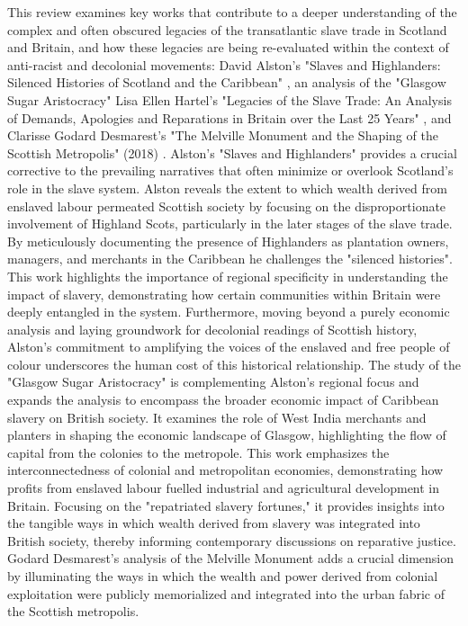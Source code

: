 \documentclass{scrartcl}
\begin{document}
This review examines key works that contribute to a deeper understanding of the complex and often obscured legacies of the transatlantic slave trade in Scotland and Britain, and how these legacies are being re-evaluated within the context of anti-racist and decolonial movements: David Alston's "Slaves and Highlanders: Silenced Histories of Scotland and the Caribbean" \cite{alston_2021}, an analysis of the "Glasgow Sugar Aristocracy" \cite{mullen_2022} Lisa Ellen Hartel's "Legacies of the Slave Trade: An Analysis of Demands, Apologies and Reparations in Britain over the Last 25 Years" \cite{hartel_2024} , and Clarisse Godard Desmarest's "The Melville Monument and the Shaping of the Scottish Metropolis" (2018) \cite{godard_2018}.
Alston's "Slaves and Highlanders" provides a crucial corrective to the prevailing narratives that often minimize or overlook Scotland's role in the slave system. 
Alston reveals the extent to which wealth derived from enslaved labour permeated Scottish society by focusing on the disproportionate involvement of Highland Scots, particularly in the later stages of the slave trade.
By meticulously documenting the presence of Highlanders as plantation owners, managers, and merchants in the Caribbean he challenges the "silenced histories".
This work highlights the importance of regional specificity in understanding the impact of slavery, demonstrating how certain communities within Britain were deeply entangled in the system.
 Furthermore, moving beyond a purely economic analysis and laying groundwork for decolonial readings of Scottish history, Alston's commitment to amplifying the voices of the enslaved and free people of colour underscores the human cost of this historical relationship.
The study of the "Glasgow Sugar Aristocracy" is complementing Alston's regional focus and expands the analysis to encompass the broader economic impact of Caribbean slavery on British society.
It examines the role of West India merchants and planters in shaping the economic landscape of Glasgow, highlighting the flow of capital from the colonies to the metropole.
This work emphasizes the interconnectedness of colonial and metropolitan economies, demonstrating how profits from enslaved labour fuelled industrial and agricultural development in Britain.
Focusing on the "repatriated slavery fortunes," it provides insights into the tangible ways in which wealth derived from slavery was integrated into British society, thereby informing contemporary discussions on reparative justice.
Godard Desmarest's analysis of the Melville Monument adds a crucial dimension by illuminating the ways in which the wealth and power derived from colonial exploitation were publicly memorialized and integrated into the urban fabric of the Scottish metropolis.
\end{document}
